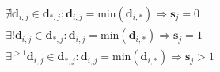 \documentclass[twocolumn]{svjour3}[2016]
\begin{document}
\begin{align}
\nexists \textbf{d}_{i,j} \in \textbf{d}_{*,j}:\textbf{d}_{i,j}=\textrm{min}(\textbf{d}_{i,*}) \Rightarrow \textbf{s}_j = 0\\
\exists! \textbf{d}_{i,j} \in \textbf{d}_{*,j}:\textbf{d}_{i,j}=\textrm{min}(\textbf{d}_{i,*}) \Rightarrow \textbf{s}_j = 1\\
\exists^{>1} \textbf{d}_{i,j} \in \textbf{d}_{*,j}:\textbf{d}_{i,j}=\textrm{min}(\textbf{d}_{i,*}) \Rightarrow \textbf{s}_j > 1
\end{align}
\end{document}
